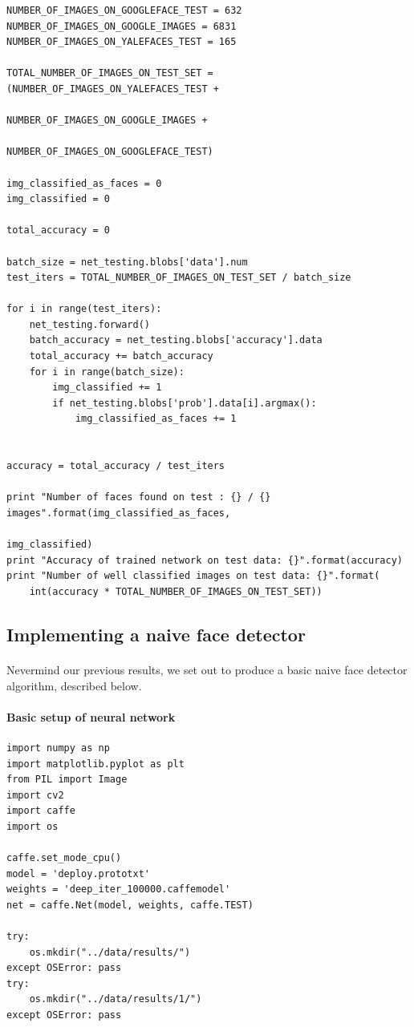 \documentclass[french]{article}
\begin{document}
\begin{verbatim}
NUMBER_OF_IMAGES_ON_GOOGLEFACE_TEST = 632
NUMBER_OF_IMAGES_ON_GOOGLE_IMAGES = 6831
NUMBER_OF_IMAGES_ON_YALEFACES_TEST = 165

TOTAL_NUMBER_OF_IMAGES_ON_TEST_SET = (NUMBER_OF_IMAGES_ON_YALEFACES_TEST +
                                      NUMBER_OF_IMAGES_ON_GOOGLE_IMAGES +
                                      NUMBER_OF_IMAGES_ON_GOOGLEFACE_TEST)

img_classified_as_faces = 0
img_classified = 0

total_accuracy = 0

batch_size = net_testing.blobs['data'].num
test_iters = TOTAL_NUMBER_OF_IMAGES_ON_TEST_SET / batch_size

for i in range(test_iters):
    net_testing.forward()
    batch_accuracy = net_testing.blobs['accuracy'].data
    total_accuracy += batch_accuracy
    for i in range(batch_size):
        img_classified += 1
        if net_testing.blobs['prob'].data[i].argmax():
            img_classified_as_faces += 1
            

accuracy = total_accuracy / test_iters

print "Number of faces found on test : {} / {} images".format(img_classified_as_faces,
                                                              img_classified)
print "Accuracy of trained network on test data: {}".format(accuracy)
print "Number of well classified images on test data: {}".format(
    int(accuracy * TOTAL_NUMBER_OF_IMAGES_ON_TEST_SET))
\end{verbatim}

\subsection{Implementing a naive face detector}

\paragraph{} Nevermind our previous results, we set out to produce a basic naive face detector algorithm, described below.

\paragraph{Basic setup of neural network}

\begin{verbatim}
import numpy as np
import matplotlib.pyplot as plt
from PIL import Image
import cv2
import caffe
import os

caffe.set_mode_cpu()
model = 'deploy.prototxt'
weights = 'deep_iter_100000.caffemodel'
net = caffe.Net(model, weights, caffe.TEST)

try:
    os.mkdir("../data/results/")
except OSError: pass
try:
    os.mkdir("../data/results/1/")
except OSError: pass
\end{verbatim}
\end{document}

